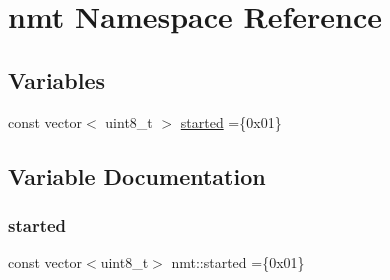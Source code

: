 \hypertarget{namespacenmt}{}\section{nmt Namespace Reference}
\label{namespacenmt}
\subsection*{Variables}
\begin{DoxyCompactItemize}
\item 
const vector$<$ uint8\+\_\+t $>$ \hyperlink{namespacenmt_a1310e5c59553352490180a42ef1dad8c}{started} =\{0x01\}
\end{DoxyCompactItemize}


\subsection{Variable Documentation}
\mbox{\label{namespacenmt_a1310e5c59553352490180a42ef1dad8c}} 
\subsubsection{\texorpdfstring{started}{started}}
{\footnotesize\ttfamily const vector$<$uint8\+\_\+t$>$ nmt\+::started =\{0x01\}}

